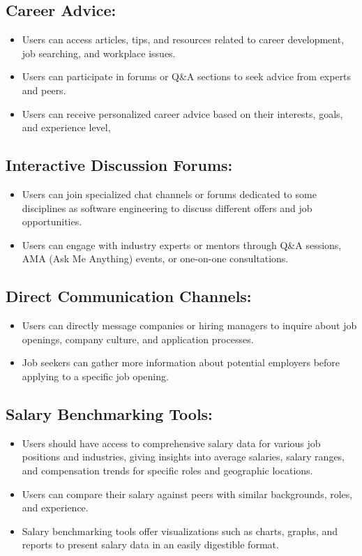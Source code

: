 \documentclass[titlepage]{article}
\begin{document}
\subsection{Career Advice:}
\begin{itemize}
    \item Users can access articles, tips, and resources related to career development, job searching, and workplace issues.
    \item Users can participate in forums or Q\&A sections to seek advice from experts and peers.
    \item Users can receive personalized career advice based on their interests, goals, and experience level,
\end{itemize}

\subsection{Interactive Discussion Forums:}
\begin{itemize}
    \item Users can join specialized chat channels or forums dedicated to some disciplines as software engineering to discuss different offers and job opportunities.
    \item Users can engage with industry experts or mentors through Q\&A sessions, AMA (Ask Me Anything) events, or one-on-one consultations.
\end{itemize}

\subsection{Direct Communication Channels:}
\begin{itemize}
    \item Users can directly message companies or hiring managers to inquire about job openings, company culture, and application processes.
    \item Job seekers can gather more information about potential employers before applying to a specific job opening.
\end{itemize}
\subsection{Salary Benchmarking Tools:}
\begin{itemize}
    \item Users should have access to comprehensive salary data for various job positions and industries, giving insights into average salaries, salary ranges, and compensation trends for specific roles and geographic locations.
    \item Users can compare their salary against peers with similar backgrounds, roles, and experience.
    \item Salary benchmarking tools offer visualizations such as charts, graphs, and reports to present salary data in an easily digestible format.
\end{itemize}
\end{document}
